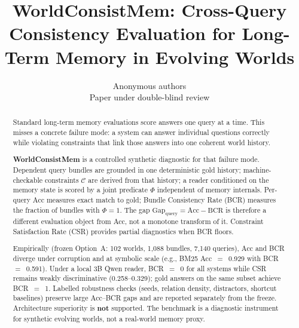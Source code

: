 \documentclass{article}
\title{WorldConsistMem: Cross-Query Consistency Evaluation for Long-Term Memory in Evolving Worlds}
\author{
Anonymous authors\\
Paper under double-blind review
}
\newcommand{\Acc}{\mathrm{Acc}}
\newcommand{\BCR}{\mathrm{BCR}}
\newcommand{\Gapq}{\mathrm{Gap}_{\mathrm{query}}}
\begin{document}
\maketitle

\begin{abstract}
Standard long-term memory evaluations score answers one query at a time. This misses a concrete failure mode: a system can answer individual questions correctly while violating constraints that link those answers into one coherent world history.

\textbf{WorldConsistMem} is a controlled synthetic diagnostic for that failure mode. Dependent query bundles are grounded in one deterministic gold history; machine-checkable constraints $\mathcal{C}$ are derived from that history; a reader conditioned on the memory state is scored by a joint predicate $\Phi$ independent of memory internals. Per-query Acc measures exact match to gold; Bundle Consistency Rate (BCR) measures the fraction of bundles with $\Phi=1$. The gap $\Gapq=\Acc-\BCR$ is therefore a different evaluation object from Acc, not a monotone transform of it. Constraint Satisfaction Rate (CSR) provides partial diagnostics when BCR floors.

Empirically (frozen Option~A: 102 worlds, 1{,}088 bundles, 7{,}140 queries), Acc and BCR diverge under corruption and at symbolic scale (e.g., BM25 Acc~$=$~0.929 with BCR~$=$~0.591). Under a local 3B Qwen reader, BCR~$=$~0 for all systems while CSR remains weakly discriminative (0.258--0.329); gold answers on the same subset achieve BCR~$=$~1. Labelled robustness checks (seeds, relation density, distractors, shortcut baselines) preserve large Acc--BCR gaps and are reported separately from the freeze. Architecture superiority is \textbf{not} supported. The benchmark is a diagnostic instrument for synthetic evolving worlds, not a real-world memory proxy.
\end{abstract}
















\appendix

\end{document}
